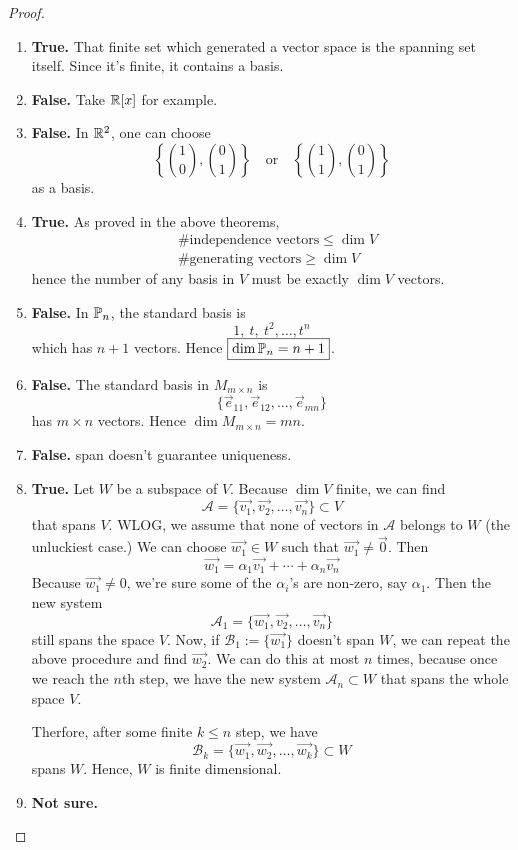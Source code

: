 \documentclass{article}
\def\by{\times}
\begin{document}
\begin{proof}
  \begin{enumerate}
    \item \textbf{True.} That finite set which generated a vector space
      is the spanning set itself. Since it's finite, it contains a
      basis.
    \item \textbf{False.} Take $\R[x]$ for example.
    \item \textbf{False.} In $\R^2$, one can choose 
      \[
        \left\{\binom{1}{0}, \binom{0}{1}\right\}
        \quad\text{or}\quad
        \left\{\binom{1}{1}, \binom{0}{1}\right\}
      \]
      as a basis.
    \item \textbf{True.} As proved in the above theorems,
      \begin{align*}
        &\text{\# independence vectors}\leq \dim V\\
        &\text{\# generating vectors}\geq \dim V
      \end{align*}
      hence the number of any basis in $V$ must be exactly $\dim V$ vectors.
    \item \textbf{False.} In $\P_n$, the standard basis is
      \[
        1,~t,~t^2,\dots,t^n
      \]
      which has $n+1$ vectors. Hence $\boxed{\dim\P_n=n+1}$.
    \item \textbf{False.} The standard basis in $M_{m\by n}$ is
      \[
        \{\vec{e}_{11},\vec{e}_{12},\dots,\vec{e}_{mn}\}
      \]
      has $m\times n$ vectors. Hence $\boxed{\dim M_{m\by n}=mn}$.
    \item \textbf{False.} span doesn't guarantee uniqueness.
    \item \textbf{True.} Let $W$ be a subspace of $V$. Because $\dim V$
      finite, we can find 
      $$\mathcal{A}=\{\vec{v_1},\vec{v_2},\dots,\vec{v_n}\}\subset V$$
      that spans $V$. WLOG, we assume that none of vectors in $\mathcal{A}$
      belongs to $W$ (the unluckiest case.) We can choose 
      $\vec{w_1}\in W$ such that $\vec{w_1}\neq\vec{0}$. Then
      \[
        \vec{w_1}=\alpha_1\vec{v_1}+\cdots+\alpha_n\vec{v_n}
      \]
      Because $\vec{w_1}\neq 0$, we're sure some of the $\alpha_i$'s are
      non-zero, say $\alpha_1$. Then the new system
      \[
        \mathcal{A}_1=\{\vec{w_1},\vec{v_2},\dots,\vec{v_n}\}
      \]
      still spans the space $V$. Now, if $\mathcal{B}_1:=\{\vec{w_1}\}$
      doesn't span $W$, we can repeat the above procedure and find 
      $\vec{w_2}$. We can do this at most $n$ times, because once
      we reach the $n$th step, we have the new system 
      $\mathcal{A}_n\subset W$ that spans the whole space $V$.

      Therfore, after some finite $k\le n$ step, we have
      \[
        \mathcal{B}_k=\{\vec{w_1},\vec{w_2},\dots,\vec{w_k}\}\subset W
      \]
      spans $W$. Hence, $W$ is finite dimensional.
    \item \textbf{Not sure.}
  \end{enumerate}
\end{proof}
\end{document}
